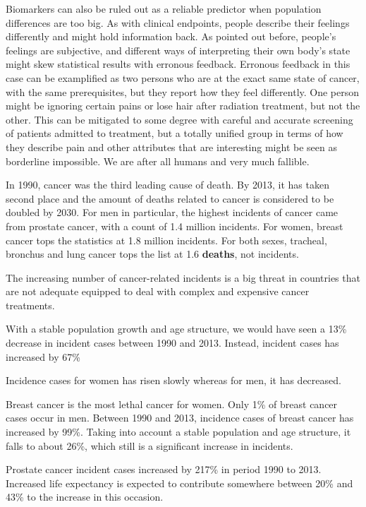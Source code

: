 Biomarkers can also be ruled out as a reliable predictor when population
differences are too big. As with clinical endpoints, people describe their
feelings differently and might hold information back. As pointed out before,
people's feelings are subjective, and different ways of interpreting their own
body's state might skew statistical results with erronous feedback. Erronous
feedback in this case can be examplified as two persons who are at the exact
same state of cancer, with the same prerequisites, but they report how they feel
differently. One person might be ignoring certain pains or lose hair after
radiation treatment, but not the other. This can be mitigated to some degree
with careful and accurate screening of patients admitted to treatment, but a
totally unified group in terms of how they describe pain and other attributes
that are interesting might be seen as borderline impossible. We are after all
humans and very much fallible.

In 1990, cancer was the third leading cause of death. By 2013, it has taken
second place and the amount of deaths related to cancer is considered to be
doubled by 2030. For men in particular, the highest incidents of cancer came
from prostate cancer, with a count of 1.4 million incidents. For women, breast
cancer tops the statistics at 1.8 million incidents. For both sexes, tracheal,
bronchus and lung cancer tops the list at 1.6 \textbf{deaths}, not incidents.

The increasing number of cancer-related incidents is a big threat in countries
that are not adequate equipped to deal with complex and expensive cancer
treatments.

With a stable population growth and age structure, we would have seen a 13\%
decrease in incident cases between 1990 and 2013. Instead, incident cases has
increased by 67\%

Incidence cases for women has risen slowly whereas for men, it has decreased.

Breast cancer is the most lethal cancer for women. Only 1\% of breast cancer
cases occur in men. Between 1990 and 2013, incidence cases of breast cancer has
increased by 99\%. Taking into account a stable population and age structure, it
falls to about 26\%, which still is a significant increase in incidents.

Prostate cancer incident cases increased by 217\% in period 1990 to 2013.
Increased life expectancy is expected to contribute somewhere between 20\% and
43\% to the increase in this occasion.


